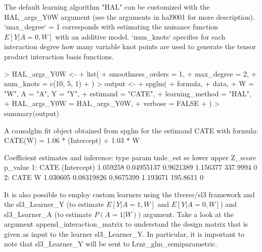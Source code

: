 \documentclass[article]{jss}
\begin{document}
The default learning algorithm "HAL" can be customized with the HAL\_args\_Y0W argument (see the arguments in hal9001 for more description). `max\_degree` = 1 corresponds with estimating the nuisance function $E[Y|A=0,W]$ with an additive model. `num\_knots` specifies for each interaction degree how many variable knot points are used to generate the tensor product interaction basis functions. 

\begin{Schunk}
\begin{Sinput}
> HAL_args_Y0W <-
+   list(
+     smoothness_orders = 1,
+     max_degree = 2,
+     num_knots = c(10, 5, 1)
+   )
> output <-
+   spglm(
+     formula,
+     data,
+     W = "W", A = "A", Y = "Y",
+     estimand = "CATE",
+     learning_method = "HAL",
+     HAL_args_Y0W = HAL_args_Y0W,
+     verbose = FALSE
+   )
> summary(output)
\end{Sinput}
\begin{Soutput}
A causalglm fit object obtained from spglm for the estimand CATE with formula: 
CATE(W) = 1.06 * (Intercept) + 1.03 * W

Coefficient estimates and inference:
   type       param tmle_est         se     lower    upper  Z_score p_value
1: CATE (Intercept) 1.059258 0.04955137 0.9621389 1.156377 337.9994       0
2: CATE           W 1.030605 0.08319826 0.8675399 1.193671 195.8611       0
\end{Soutput}
\end{Schunk}

It is also possible to employ custom learners using the tlverse/sl3 framework and the sl3\_Learner\_Y (to estimate $E[Y|A=1,W]$ and $E[Y|A=0,W]$) and sl3\_Learner\_A (to estimate $P(A=1|W)$) argument.
Take a look at the argument append\_interaction\_matrix to understand the design matrix that is given as input to the learner sl3\_Learner\_Y. In particular, it is important to note that sl3\_Learner\_Y will be sent to Lrnr\_glm\_semiparametric.
\end{document}
